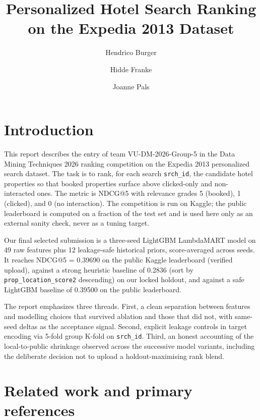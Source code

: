\documentclass[runningheads]{llncs}
\title{Personalized Hotel Search Ranking on the Expedia 2013 Dataset}
\author{Hendrico Burger\inst{1} \and
Hidde Franke\inst{1} \and
Joanne Pals\inst{1}}
\institute{Vrije Universiteit Amsterdam, Faculty of Science, Amsterdam, the Netherlands\\
\email{\{h.burger,h.franke,j.pals\}@student.vu.nl}}
\begin{document}
\maketitle

\section{Introduction}
\label{sec:intro}

This report describes the entry of team VU-DM-2026-Group-5 in the
Data Mining Techniques 2026 ranking competition on the Expedia 2013
personalized search dataset. The task is to rank, for each search
\texttt{srch\_id}, the candidate hotel properties so that booked
properties surface above clicked-only and non-interacted ones. The
metric is NDCG@5 with relevance grades 5 (booked), 1 (clicked), and
0 (no interaction). The competition is run on Kaggle; the public
leaderboard is computed on a fraction of the test set and is used
here only as an external sanity check, never as a tuning target.

Our final selected submission is a three-seed LightGBM LambdaMART
model on 49 raw features plus 12 leakage-safe historical priors,
score-averaged across seeds. It reaches NDCG@5 = 0.39690 on the
public Kaggle leaderboard (verified upload), against a strong
heuristic baseline of 0.2836 (sort by \texttt{prop\_location\_score2}
descending) on our locked holdout, and against a safe LightGBM
baseline of 0.39500 on the public leaderboard.

The report emphasizes three threads. First, a clean separation
between features and modelling choices that survived ablation and
those that did not, with same-seed deltas as the acceptance signal.
Second, explicit leakage controls in target encoding via 5-fold
group K-fold on \texttt{srch\_id}. Third, an honest accounting of
the local-to-public shrinkage observed across the successive model
variants, including the deliberate decision not to upload a
holdout-maximising rank blend.

\section{Related work and primary references}
\label{sec:related}
\end{document}
